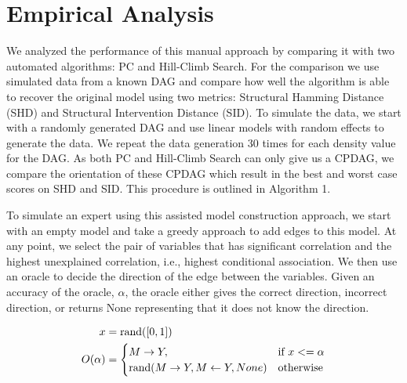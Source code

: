 \documentclass[letterpaper]{article} %
\begin{document}

\section{Empirical Analysis}
\label{sec:empirical}

We analyzed the performance of this manual approach by comparing it with two
automated algorithms: PC and Hill-Climb Search. For the comparison we use
simulated data from a known DAG and compare how well the algorithm is able to
recover the original model using two metrics: Structural Hamming Distance (SHD)
and Structural Intervention Distance (SID). To simulate the data, we start with
a randomly generated DAG and use linear models with random effects to generate
the data. We repeat the data generation $ 30 $ times for each density value for
the DAG. As both PC and Hill-Climb Search can only give us a CPDAG, we compare
the orientation of these CPDAG which result in the best and worst case scores
on SHD and SID. This procedure is outlined in Algorithm 1.


To simulate an expert using this assisted model construction approach, we start
with an empty model and take a greedy approach to add edges to this model. At
any point, we select the pair of variables that has significant correlation and
the highest unexplained correlation, i.e., highest conditional association. We
then use an oracle to decide the direction of the edge between the variables.
Given an accuracy of the oracle, $ \alpha $, the oracle either gives the
correct direction, incorrect direction, or returns None representing that it
does not know the direction.

\begin{equation}
	\begin{split}
		x &= \textnormal{rand}([0, 1]) \\
		O(\alpha) &= \begin{cases} 
			M \rightarrow Y, & \textnormal{if  } x <= \alpha \\
			\textnormal{rand}(M \rightarrow Y, M \leftarrow Y, None) & \textnormal{otherwise} \\
				\end{cases} \\
	\end{split}
\end{equation}
\end{document}

